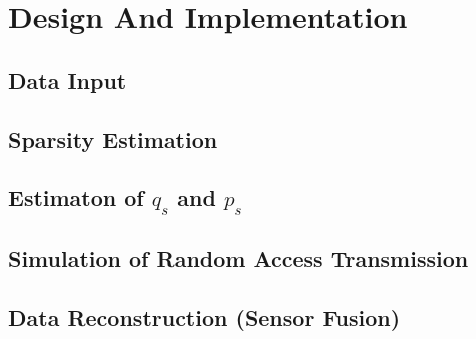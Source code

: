 \documentclass[Main]{subfiles}
\begin{document}
\section{Design And Implementation} %
\label{sec:design_and_implementation}

	\subsection{Data Input} %
	\label{sub:data_input}
	

	\subsection{Sparsity Estimation} %
	\label{sub:sparsity_estimation}
	

	\subsection{Estimaton of $q_s$ and $p_s$} %
	\label{sub:estimaton_of_q_s_and_p_s_}
	

	\subsection{Simulation of Random Access Transmission} %
	\label{sub:simulation_of_random_access_transmission}
	

	\subsection{Data Reconstruction (Sensor Fusion)} %
	\label{sub:data_reconstruction_}
	

\end{document}
